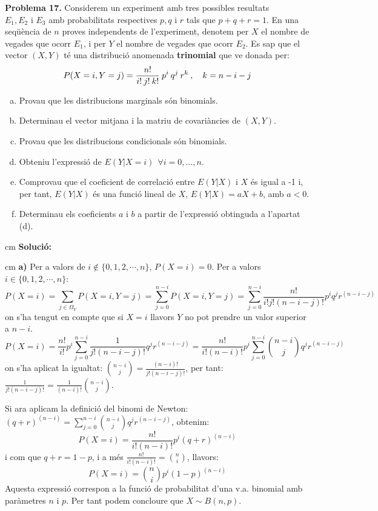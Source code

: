 \documentclass{article}
\begin{document}
\newpage
\noindent
\textbf{Problema 17.} 
Considerem un experiment amb tres possibles resultats $E_1,
E_2 \mbox{ i } E_3$ amb probabilitats respectives $p,q$ i $r$ tals
que $p+q+r = 1.$ En una seq\"{u}\`encia de $n$ proves independents de
l'experiment, denotem per $X$ el nombre de vegades que ocorr
$E_1$, i per $Y$ el nombre de vegades que ocorr $E_2$. Es sap que
el vector $(X,Y)$ t\'e una distribuci\'o anomenada \textbf{trinomial}
que ve donada per: $$P(X=i,Y=j) = {n! \over i! \> j! \> k!} \>
p^i \> q^j \> r^k \> , \ \ \ k = n-i-j$$
\begin{enumerate}[a)]
\item Provau que les distribucions marginals s\'on binomials.
\item Determinau el vector mitjana i la matriu de covari\`ancies de
$(X,Y)$.
\item Provau que les distribucions condicionals s\'on binomials.
\item Obteniu l'expressi\'o de $E(Y | X = i) \ \ \forall i = 0,
 \ldots , n$.
\item Comprovau que el coeficient de correlaci\'o entre $E(Y | X)$
i $X$ \'es igual a -1 i, per tant, $E(Y | X)$ \'es una funci\'o lineal
de $X$, $E(Y | X) = a X + b$, amb $a < 0$.
\item Determinau els coeficients $a$ i $b$ a partir de
l'expressi\'o obtinguda a l'apartat (d).
\end{enumerate}

 cm
\noindent
\textbf{Soluci\'o:} 

 cm
\noindent
\textbf{a)} Per a valors de $i \notin \{0, 1, 2, \cdots, n\}$, $P(X=i)=0$.
Per a valors $i \in \{0, 1, 2, \cdots, n\}$:
\[
P(X=i)=\sum_{j \in \Omega_Y} P(X=i, Y=j)= \sum_{j=0}^{n-i} P(X=i, Y=j) = 
\sum_{j=0}^{n-i} \frac{n!}{i! j! (n-i-j)!} p^i q^j r^{(n-i-j)}
\]
\noindent
on s'ha tengut en compte que si $X=i$ llavors $Y$ no pot prendre un valor
superior a $n-i$.
\[
P(X=i)=\frac{n!}{i!} p^i \sum_{j=0}^{n-i} \frac{1}{j! (n-i-j)!} q^j r^{(n-i-j)} =
 \frac{n!}{i! (n-i)!} p^i \sum_{j=0}^{n-i} \binom{n-i}{j} q^j r^{(n-i-j)}
\]
\noindent
on s'ha aplicat la igualtat: $\binom{n-i}{j}=\frac{(n-i)!}{j! (n-i-j)!}$, per tant:
$\frac{1}{j! (n-i-j)!}=\frac{1}{(n-i)!} \binom{n-i}{j}$.

\vskip 0.2cm
\noindent
Si ara aplicam la definici\'o del binomi de Newton: 
$(q+r)^{(n-i)}=\sum_{j=0}^{n-i} \binom{n-i}{j} q^j r^{(n-i-j)}$, obtenim:
\[
P(X=i)= \frac{n!}{i! (n-i)!} p^i (q+r)^{(n-i)}
\]
\noindent
i com que $q+r=1-p$, i a m\'es $\frac{n!}{i! (n-i)!}=\binom{n}{i}$, llavors:
\[
P(X=i)=\binom{n}{i} p^i (1-p)^{(n-i)}
\]
\noindent
Aquesta expressi\'o correspon a la funci\'o de probabilitat d'una v.a. 
binomial amb par\`ametres $n$ i $p$. Per tant podem concloure que $X \sim B(n, p)$.
\end{document}
